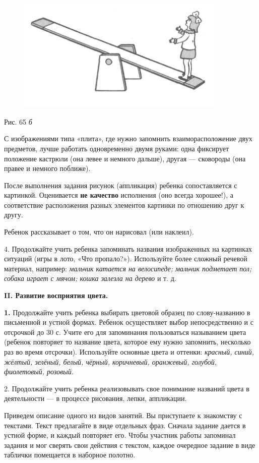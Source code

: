 \documentclass[a5paper]{book}
\renewcommand{\emph}[1]{\textit{#1}}
\begin{document}
\begin{figure}
\centering
\includegraphics[width=3.93174in,height=2.13694in]{media/media/image63.jpg}
\end{figure}

Рис. 65 \emph{б}

С изображениями типа «плита», где нужно запомнить взаиморасположение
двух предметов, лучше работать одновременно двумя руками: одна фиксирует
положение кастрюли (она левее и немного дальше), другая --- сковороды
(она правее и немного поближе).

После выполнения задания рисунок (аппликация) ребенка сопоставляется с
картинкой. Оценивается \textbf{не качество} исполнения (оно всегда
хорошее!), а соответствие расположения разных элементов картинки по
отношению друг к другу.

Ребенок рассказывает о том, что он нарисовал (или наклеил).

4. Продолжайте учить ребенка запоминать названия изображенных на
картинках ситуаций (игры в лото, «Что пропало?»). Используйте более
сложный речевой материал, например: \emph{мальчик катается на
велосипеде; мальчик подметает пол; собака играет с мячом; кошка залезла
на дерево} и т. д.

\textbf{II. Развитие восприятия цвета.}

\textbf{1.} Продолжайте учить ребенка выбирать цветовой образец по
слову-названию в письменной и устной формах. Ребенок осуществляет выбор
непосредственно и с отсрочкой до 30 с. Учите его для запоминания
пользоваться называнием цвета (ребенок повторяет то название цвета,
которое ему нужно запомнить, несколько раз во время отсрочки).
Используйте основные цвета и оттенки: \emph{красный, синий, жёлтый,
зелёный, белый, чёрный, коричневый, оранжевый, голубой, фиолетовый,
розовый.}

2. Продолжайте учить ребенка реализовывать свое понимание названий цвета
в деятельности --- в процессе рисования, лепки, аппликации.

Приведем описание одного из видов занятий. Вы приступаете к знакомству с
текстами. Текст предлагайте в виде отдельных фраз. Сначала задание
дается в устной форме, и каждый повторяет его. Чтобы участник работы
запоминал задания и мог сверять свои действия с текстом, каждое
очередное задание в виде таблички помещается в наборное полотно.
\end{document}
